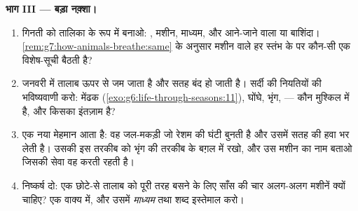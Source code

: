 \begin{problem}[{सप्ताहांत समस्या --- एक तालाब, और काम पर हर
मशीन}]
\medskip\noindent\textbf{भाग III --- बड़ा नक़्शा।}
\begin{enumerate}[resume]
  \item गिनती को तालिका के रूप में बनाओ: , मशीन, माध्यम, और
        आने-जाने वाला या बाशिंदा।
        \cref{rem:g7:how-animals-breathe:same} के अनुसार मशीन वाले हर
        स्तंभ के  पर कौन-सी एक विशेष-सूची बैठती है?
  \item जनवरी में तालाब ऊपर से जम जाता है और सतह बंद हो जाती है। सर्दी
        की नियतियों की भविष्यवाणी करो: मेंढक
        (\cref{exo:g6:life-through-seasons:11}), घोंघे, भृंग,
         --- कौन मुश्किल में है, और किसका इंतज़ाम है?
  \item एक नया मेहमान आता है: वह जल-मकड़ी जो रेशम की घंटी बुनती है और
        उसमें सतह की हवा भर लेती है। उसकी इस तरकीब को भृंग की तरकीब के
        बग़ल में रखो, और उस मशीन का नाम बताओ जिसकी सेवा वह करती रहती
        है।
  \item निष्कर्ष दो: एक छोटे-से तालाब को पूरी तरह बसने के लिए साँस की
        चार अलग-अलग मशीनें क्यों चाहिए? एक वाक्य में, और उसमें
        \emph{माध्यम} तथा \emph{} शब्द इस्तेमाल करो।
\end{enumerate}
\end{problem}
